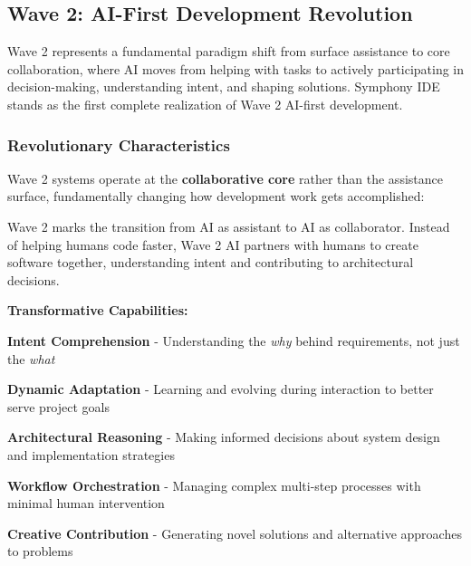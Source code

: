 \subsection{Wave 2: AI-First Development Revolution}
\label{subsec:wave2-revolution}

Wave 2 represents a fundamental paradigm shift from surface assistance to core collaboration, where AI moves from helping with tasks to actively participating in decision-making, understanding intent, and shaping solutions. Symphony IDE stands as the first complete realization of Wave 2 AI-first development.

\subsubsection{Revolutionary Characteristics}

Wave 2 systems operate at the \textbf{collaborative core} rather than the assistance surface, fundamentally changing how development work gets accomplished:

\begin{infobox}[title=Wave 2: The Collaborative Core]
Wave 2 marks the transition from AI as assistant to AI as collaborator. Instead of helping humans code faster, Wave 2 AI partners with humans to create software together, understanding intent and contributing to architectural decisions.
\end{infobox}

\textbf{Transformative Capabilities:}

\begin{expandedlist}
    \item \textbf{Intent Comprehension} - Understanding the \textit{why} behind requirements, not just the \textit{what}
    
    \item \textbf{Dynamic Adaptation} - Learning and evolving during interaction to better serve project goals
    
    \item \textbf{Architectural Reasoning} - Making informed decisions about system design and implementation strategies
    
    \item \textbf{Workflow Orchestration} - Managing complex multi-step processes with minimal human intervention
    
    \item \textbf{Creative Contribution} - Generating novel solutions and alternative approaches to problems
\end{expandedlist}

